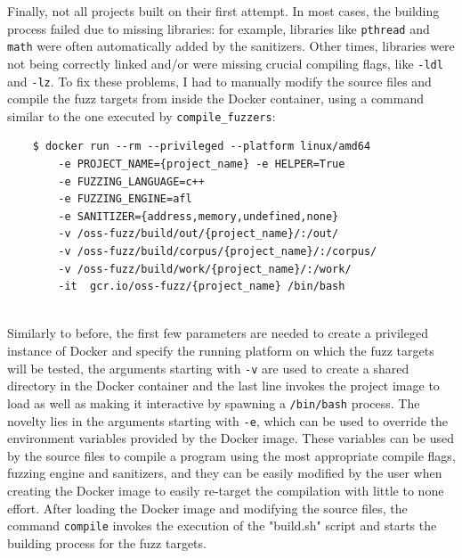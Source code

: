 \newpage
Finally, not all projects built on their first attempt.
\newline \newline
In most cases, the building process failed due to missing libraries: for example, libraries like \verb|pthread| and \verb|math| were often automatically added by the sanitizers.
\newline
Other times, libraries were not being correctly linked and/or were missing crucial compiling flags, like \verb|-ldl| and \verb|-lz|.
\newline \newline
To fix these problems, I had to manually modify the source files and compile the fuzz targets from inside the Docker container, using a command similar to the one executed by \verb|compile_fuzzers|:
\begin{verbatim}
    $ docker run --rm --privileged --platform linux/amd64 
        -e PROJECT_NAME={project_name} -e HELPER=True 
        -e FUZZING_LANGUAGE=c++ 
        -e FUZZING_ENGINE=afl 
        -e SANITIZER={address,memory,undefined,none} 
        -v /oss-fuzz/build/out/{project_name}/:/out/
        -v /oss-fuzz/build/corpus/{project_name}/:/corpus/    
        -v /oss-fuzz/build/work/{project_name}/:/work/
        -it  gcr.io/oss-fuzz/{project_name} /bin/bash
\end{verbatim}
\ \\
Similarly to before, the first few parameters are needed to create a privileged instance of Docker and specify the running platform on which the fuzz targets will be tested, the arguments starting with \verb|-v| are used to create a shared directory in the Docker container and the last line invokes the project image to load as well as making it interactive by spawning a \verb|/bin/bash| process.
\newline \newline
The novelty lies in the arguments starting with \verb|-e|, which can be used to override the environment variables provided by the Docker image.
\newline
These variables can be used by the source files to compile a program using the most appropriate compile flags, fuzzing engine and sanitizers, and they can be easily modified by the user when creating the Docker image to easily re-target the compilation with little to none effort.
\newline \newline
After loading the Docker image and modifying the source files, the command \verb|compile| invokes the execution of the "build.sh" script and starts the building process for the fuzz targets.



